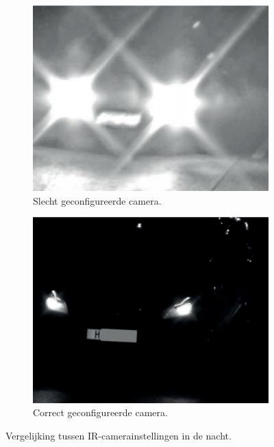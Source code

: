 \begin{figure}[h!]
	\centering
	\begin{subfigure}[b]{0.4\linewidth}
		\includegraphics[width=\linewidth]{img/night-time-lpc-bad.png}
		\caption{Slecht geconfigureerde camera.}
	\end{subfigure}
	\begin{subfigure}[b]{0.4\linewidth}
		\includegraphics[width=\linewidth]{img/night-time-lpc-good.png}
		\caption{Correct geconfigureerde camera.}
	\end{subfigure}
	\caption{Vergelijking tussen IR-camerainstellingen in de nacht. \autocite{axis2019license}}
	\label{fig:ir-nacht}
\end{figure}

